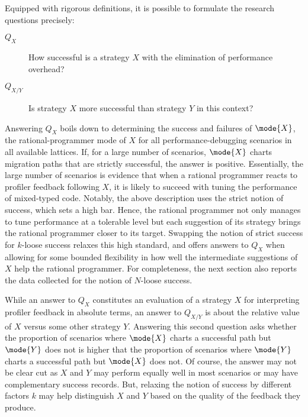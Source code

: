 
Equipped with rigorous definitions, it is possible to formulate the research
questions precisely:
\begin{description}

\item[$Q_X$] How successful is a strategy $X$ with the elimination of
  performance overhead?

\item[$Q_{X/Y}$] Is strategy $X$ more successful than strategy $Y$ in this
  context?
  
\end{description}

Answering $Q_X$ boils down to determining the success and failures of
$\mode{X}$, the rational-programmer mode of $X$ for all performance-debugging
scenarios in all available lattices. If, for a large number of scenarios,
$\mode{X}$ charts migration paths that are strictly successful, the answer is
positive. Essentially, the large number of scenarios is evidence that when a
rational programmer reacts to profiler feedback following $X$, it is likely to
succeed with tuning the performance of mixed-typed code. Notably, the above
description uses the strict notion of success, which sets a high bar.
Hence, the rational programmer not only manages to tune performance at
a tolerable level but each suggestion of its strategy brings the rational
programmer closer to its target. Swapping the notion of strict success for
$k$-loose success relaxes this high standard, and offers answers to $Q_X$ when
allowing for some bounded flexibility in how well the intermediate suggestions
of $X$ help the rational programmer. For completeness, the next section also
reports the data collected for the notion of $N$-loose success.

While an answer to $Q_X$ constitutes an evaluation of a strategy $X$ for
interpreting profiler feedback in absolute terms, an answer to $Q_{X/Y}$ is
about the relative value of $X$ versus some other strategy
$Y$. Answering this second question asks whether the proportion of scenarios
where $\mode{X}$ charts a successful path but $\mode{Y}$ does not is higher that
the proportion of scenarios where $\mode{Y}$ charts a successful path but
$\mode{X}$ does not. Of course, the answer may not be clear cut as $X$ and $Y$
may perform equally well in most scenarios or may have complementary success
records. But, relaxing the notion of success by different factors $k$ may
help distinguish $X$ and $Y$ based on the quality of the feedback they produce.


